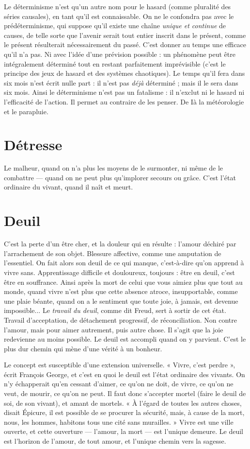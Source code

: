 Le déterminisme n’est qu’un autre nom pour le hasard (comme pluralité
des séries causales), en tant qu’il est connaissable. On ne le confondra pas avec
le prédéterminisme, qui suppose qu’il existe une chaîne {\it unique et continue} de
causes, de telle sorte que l'avenir serait tout entier inscrit dans le présent,
comme le présent résulterait nécessairement du passé. C’est donner au temps
une efficace qu’il n’a pas. Ni avec l’idée d’une prévision possible : un phénomène
peut être intégralement déterminé tout en restant parfaitement imprévisible
(c’est le principe des jeux de hasard et des systèmes chaotiques). Le temps
qu'il fera dans six mois n’est écrit nulle part : il n’est pas {\it déjà} déterminé ; mais
il le sera dans six mois. Ainsi le déterminisme n’est pas un fatalisme : il n’exclut
ni le hasard ni l'efficacité de l’action. Il permet au contraire de les penser. De Ià
la météorologie et le parapluie.

\section{Détresse}
Le malheur, quand on n’a plus les moyens de le surmonter, ni
même de le combattre — quand on ne peut plus qu’implorer
secours ou grâce. C’est l’état ordinaire du vivant, quand il naît et meurt.

\section{Deuil}
C'est la perte d’un être cher, et la douleur qui en résulte : l'amour
déchiré par l’arrachement de son objet. Blessure affective, comme
une amputation de l'essentiel. On fait alors son deuil de ce qui manque, c’est-à-dire
qu’on apprend à vivre sans. Apprentissage difficile et douloureux, toujours :
être en deuil, c’est être en souffrance. Ainsi après la mort de celui que vous aimiez
plus que tout au monde, quand vivre n’est plus que cette absence atroce, insupportable,
comme une plaie béante, quand on a le sentiment que toute joie, à
jamais, est devenue impossible... Le {\it travail du deuil}, comme dit Freud, sert à
sortir de cet état. Travail d’acceptation, de détachement progressif, de réconciliation.
Non contre l'amour, mais pour aimer autrement, puis autre chose. Il s’agit
que la joie redevienne au moins possible. Le deuil est accompli quand on y parvient.
C’est le plus dur chemin qui mène d’une vérité à un bonheur.

Le concept est susceptible d’une extension universelle. « Vivre, c’est
perdre », écrit François George, et c’est en quoi le deuil est l’état ordinaire des
vivants. On n’y échapperait qu’en cessant d’aimer, ce qu’on ne doit, de vivre,
ce qu'on ne veut, de mourir, ce qu’on ne peut. Il faut donc s’accepter mortel
(faire le deuil de soi, de son vivant), et amant de mortels. « À l'égard de toutes
les autres choses, disait Épicure, il est possible de se procurer la sécurité, mais,
à cause de la mort, nous, les hommes, habitons tous une cité sans murailles. »
Vivre est une ville ouverte, et cette ouverture — l’amour, la mort — est l’unique
demeure. Le deuil est l'horizon de l'amour, de tout amour, et l'unique chemin
vers la sagesse.

